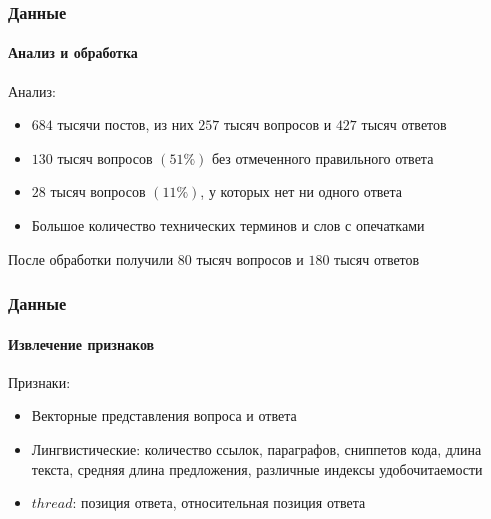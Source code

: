 \documentclass[10pt]{beamer}
\begin{document}

\begin{frame}
\frametitle{Данные}
\framesubtitle{Анализ и обработка}

Анализ:

\begin{itemize}
	\item $684$ тысячи постов, из них $257$ тысяч вопросов и $427$ тысяч ответов
	\item $130$ тысяч вопросов $(51\%)$ без отмеченного правильного ответа
	\item $28$ тысяч вопросов $(11\%)$, у которых нет ни одного ответа
	\item Большое количество технических терминов и слов с опечатками
\end{itemize}

После обработки получили $80$ тысяч вопросов и $180$ тысяч ответов

\end{frame}


\begin{frame}
\frametitle{Данные}
\framesubtitle{Извлечение признаков}

Признаки:

\begin{itemize}
	\item Векторные представления вопроса и ответа
	\item Лингвистические: количество ссылок, параграфов, сниппетов кода, длина текста, средняя длина предложения, различные индексы удобочитаемости
	\item $thread$: позиция ответа, относительная позиция ответа
\end{itemize}

\end{frame}

\end{document}
